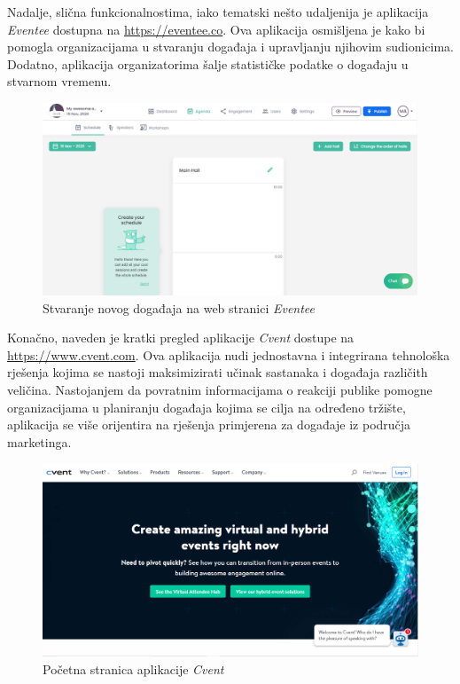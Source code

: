 		Nadalje, slična funkcionalnostima, iako tematski nešto udaljenija je aplikacija \textit{Eventee} dostupna na \url{https://eventee.co}. Ova aplikacija osmišljena je kako bi pomogla organizacijama u stvaranju događaja i upravljanju njihovim sudionicima. Dodatno, aplikacija organizatorima šalje statističke podatke o događaju u stvarnom vremenu. 
		
		
		\begin{figure}[H]
			\includegraphics[width=.9\linewidth]{slike/eventee.png} %
			\centering
			\caption{Stvaranje novog događaja na web stranici \textit{Eventee}}
			\label{fig:eventee} %
		\end{figure}
	
		Konačno, naveden je kratki pregled aplikacije \textit{Cvent} dostupe na \url{https://www.cvent.com}. Ova aplikacija nudi jednostavna i integrirana tehnološka rješenja kojima se nastoji maksimizirati učinak sastanaka i događaja različith veličina. Nastojanjem da povratnim informacijama o reakciji publike pomogne organizacijama u planiranju događaja kojima se cilja na određeno tržište, aplikacija se više orijentira na rješenja primjerena za događaje iz područja marketinga.  
		
		\begin{figure}[H]
			\includegraphics[width=.9\linewidth]{slike/cvent.png} %
			\centering
			\caption{Početna stranica aplikacije \textit{Cvent}}
			\label{fig:cvent} %
		\end{figure}
	
	
	
		
		\eject
		
		
		
		
	